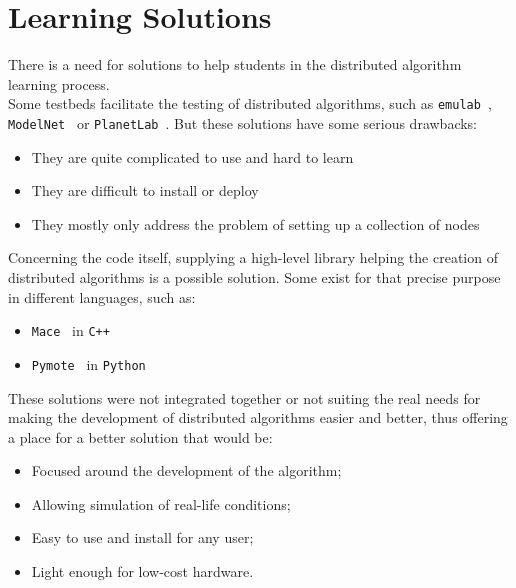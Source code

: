 \documentclass{eplmastersthesis}
\begin{document}
    \section{Learning Solutions}

      There is a need for solutions to help students in the distributed
      algorithm learning process.\\

      Some testbeds facilitate the testing of distributed algorithms, such as
      \texttt{emulab}~\cite{Emulab}, \texttt{ModelNet}~\cite{ModelNet} or
      \texttt{PlanetLab}~\cite{PlanetLab}. But these solutions have some serious
      drawbacks:

      \begin{itemize}
        \item They are quite complicated to use and hard to learn
        \item They are difficult to install or deploy
        \item They mostly only address the problem of setting up a collection
        of nodes
      \end{itemize}

      Concerning the code itself, supplying a high-level library helping the
      creation of distributed algorithms is a possible solution. Some
      exist for that precise purpose in different languages, such as:

      \begin{itemize}
        \item \texttt{Mace}~\cite{Mace} in \texttt{C++}
        \item \texttt{Pymote}~\cite{Pymote} in \texttt{Python}
      \end{itemize}

      These solutions were not integrated together or not suiting the real needs
      for making the development of distributed algorithms easier and better,
      thus offering a place for a better solution that would be:

      \begin{itemize}
        \item Focused around the development of the algorithm;
        \item Allowing simulation of real-life conditions;
        \item Easy to use and install for any user;
        \item Light enough for low-cost hardware.
      \end{itemize}
\end{document}
